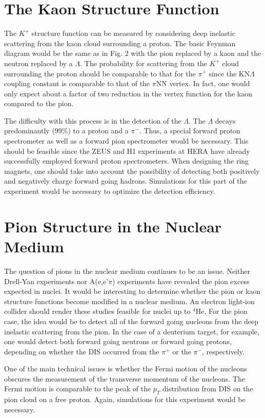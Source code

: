 \section*{The Kaon Structure Function}

The $K^+$ structure function can be measured by considering deep
inelastic scattering from the kaon cloud surrounding a proton.  The
basic Feynman diagram would be the same as in Fig. 2 with the pion
replaced by a kaon and the neutron replaced by a $\Lambda$.  The
probability for scattering from the $K^+$ cloud surrounding the proton
should be comparable to that for the $\pi^+$ since the KN$\Lambda$
coupling constant is comparable to that of the $\pi$NN vertex.  In
fact, one would only expect about a factor of two reduction in the
vertex function for the kaon compared to the pion.

The difficulty with this process is in the detection of the $\Lambda$.
The $\Lambda$ decays predominantly (99\%) to a proton and a $\pi^-$.
Thus, a special forward proton spectrometer as well as a forward pion
spectrometer would be necessary.  This should be feasible since the
ZEUS and H1 experiments at HERA have already successfully employed
forward proton spectrometers.  When designing the ring magnets, one
should take into account the possibility of detecting both positively
and negatively charge forward going hadrons.  Simulations for this
part of the experiment would be necessary to optimize the detection
efficiency.

\section*{Pion Structure in the Nuclear Medium}

The question of pions in the nuclear medium continues to be an issue.
Neither Drell-Yan experiments\cite{drellyan} nor A(e,e'$\pi$) experiments
\cite{jackson} have
revealed the pion excess expected in nuclei.  It would be interesting
to determine whether the pion or kaon structure functions become
modified in a nuclear medium.  An electron light-ion collider should
render these studies feasible for nuclei up to $^4$He.  For the pion
case, the idea would be to detect all of the forward going nucleons
from the deep inelastic scattering from the pion.  In the case of a
deuterium target, for example, one would detect both forward going
neutrons or forward going protons, depending on whether the DIS
occurred from the $\pi^+$ or the $\pi^-$, respectively.

One of the main technical issues is whether the Fermi motion of the
nucleons obscures the measurement of the transverse momentum of the
nucleons.  The Fermi motion is comparable to the peak of the $p_T$
distribution from DIS on the pion cloud on a free proton.  Again,
simulations for this experiment would be necessary.

